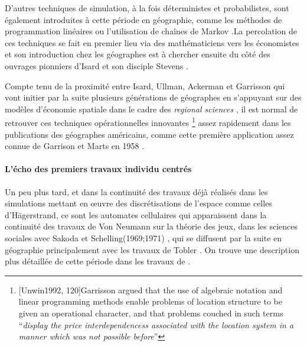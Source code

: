 D'autres techniques de simulation, à la fois déterministes et probabilistes, sont également introduites à cette période en géographie, comme les méthodes de programmation linéaires ou l'utilisation de chaînes de Markov \autocites{Marble1964, Clark1965, Whitelegg1976}.La percolation de ces techniques se fait en premier lieu via des mathématiciens vers les économistes \autocite{Samuelson1952} et son introduction chez les géographes est à chercher ensuite du côté des ouvrages pionniers d'Isard \autocites{Isard1958, Isard1960} et son disciple Stevens \autocite{Stevens1958}.

Compte tenu de la proximité entre Isard, Ullman, Ackerman et Garrisson \autocite{Barnes2004} qui vont initier par la suite plusieurs générations de géographes en s'appuyant sur des modèles d'économie spatiale dans le cadre des \textit{regional sciences} \autocite[120]{Unwin1992}, il est normal de retrouver ces techniques opérationnelles innovantes \footnote{ [Unwin1992, 120]{Garrisson argued that the use of algebraic notation and linear programming methods enable problems of location structure to be given an operational character, and that problems couched in such terms \enquote{\textit{display the price interdependencess associated with the location system in a manner which was not possible before}}}} assez rapidement dans les publications des géographes américains, comme cette première application assez connue de Garrison et Marts en 1958 \autocite{Garrison1958}.


\paragraph{L'écho des premiers travaux individu centrés}

Un peu plus tard, et dans la continuité des travaux déjà réalisés dans les simulations mettant en œuvre des discrétisations de l'espace comme celles d'Hägerstrand, ce sont les automates cellulaires qui apparaissent dans la continuité des travaux de Von Neumann sur la théorie des jeux, dans les sciences sociales avec Sakoda \autocites{Sakoda1949,Sakoda1971} et Schelling(1969;1971) \autocite{Ganguly2003}, qui se diffusent par la suite en géographie principalement avec les travaux de Tobler \autocites{Tobler1970b,Tobler1979} . On trouve une description plus détaillée de cette période dans les travaux de \textcite{Louail2010}.

